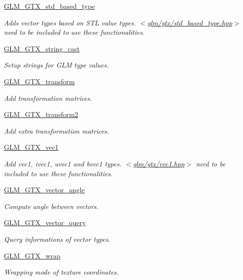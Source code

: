 \begin{DoxyCompactItemize}
\hyperlink{group__gtx__std__based__type}{G\-L\-M\-\_\-\-G\-T\-X\-\_\-std\-\_\-based\-\_\-type}
\begin{DoxyCompactList}\small\item\em Adds vector types based on S\-T\-L value types. $<$\hyperlink{std__based__type_8hpp}{glm/gtx/std\-\_\-based\-\_\-type.\-hpp}$>$ need to be included to use these functionalities. \end{DoxyCompactList}\item 
\hyperlink{group__gtx__string__cast}{G\-L\-M\-\_\-\-G\-T\-X\-\_\-string\-\_\-cast}
\begin{DoxyCompactList}\small\item\em Setup strings for G\-L\-M type values. \end{DoxyCompactList}\item 
\hyperlink{group__gtx__transform}{G\-L\-M\-\_\-\-G\-T\-X\-\_\-transform}
\begin{DoxyCompactList}\small\item\em Add transformation matrices. \end{DoxyCompactList}\item 
\hyperlink{group__gtx__transform2}{G\-L\-M\-\_\-\-G\-T\-X\-\_\-transform2}
\begin{DoxyCompactList}\small\item\em Add extra transformation matrices. \end{DoxyCompactList}\item 
\hyperlink{group__gtx__vec1}{G\-L\-M\-\_\-\-G\-T\-X\-\_\-vec1}
\begin{DoxyCompactList}\small\item\em Add vec1, ivec1, uvec1 and bvec1 types. $<$\hyperlink{vec1_8hpp}{glm/gtx/vec1.\-hpp}$>$ need to be included to use these functionalities. \end{DoxyCompactList}\item 
\hyperlink{group__gtx__vector__angle}{G\-L\-M\-\_\-\-G\-T\-X\-\_\-vector\-\_\-angle}
\begin{DoxyCompactList}\small\item\em Compute angle between vectors. \end{DoxyCompactList}\item 
\hyperlink{group__gtx__vector__query}{G\-L\-M\-\_\-\-G\-T\-X\-\_\-vector\-\_\-query}
\begin{DoxyCompactList}\small\item\em Query informations of vector types. \end{DoxyCompactList}\item 
\hyperlink{group__gtx__wrap}{G\-L\-M\-\_\-\-G\-T\-X\-\_\-wrap}
\begin{DoxyCompactList}\small\item\em Wrapping mode of texture coordinates. \end{DoxyCompactList}\end{DoxyCompactItemize}


